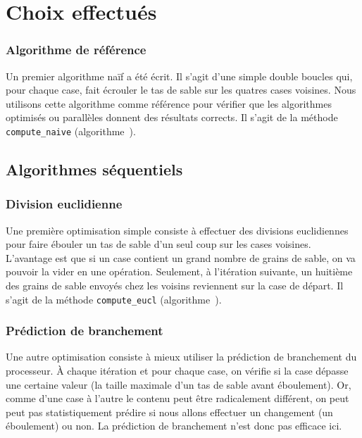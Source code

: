 \section {Choix effectués}

\subsubsection{Algorithme de référence}

Un premier algorithme naïf a été écrit. Il s'agit d'une simple double
boucles qui, pour chaque case, fait écrouler le tas de sable sur les
quatres cases voisines.  Nous utilisons cette algorithme comme
référence pour vérifier que les algorithmes optimisés ou parallèles
donnent des résultats corrects. Il s'agit de la méthode
\texttt{compute\_naive} (algorithme~).


\subsection{Algorithmes séquentiels}

\subsubsection{Division euclidienne}

Une première optimisation simple consiste à effectuer des divisions
euclidiennes pour faire ébouler un tas de sable d'un seul coup sur les
cases voisines. L'avantage est que si un case contient un grand nombre
de grains de sable, on va pouvoir la vider en une
opération. Seulement, à l'itération suivante, un huitième des grains
de sable envoyés chez les voisins reviennent sur la case de départ.
Il s'agit de la méthode \texttt{compute\_eucl} (algorithme~).
\medskip

\subsubsection{Prédiction de branchement}

Une autre optimisation consiste à mieux utiliser la prédiction de
branchement du processeur.  À chaque itération et pour chaque case, on
vérifie si la case dépasse une certaine valeur (la taille maximale
d'un tas de sable avant éboulement). Or, comme d'une case à l'autre le
contenu peut être radicalement différent, on peut peut pas
statistiquement prédire si nous allons effectuer un changement (un
éboulement) ou non. La prédiction de branchement n'est donc pas
efficace ici.
\medskip

